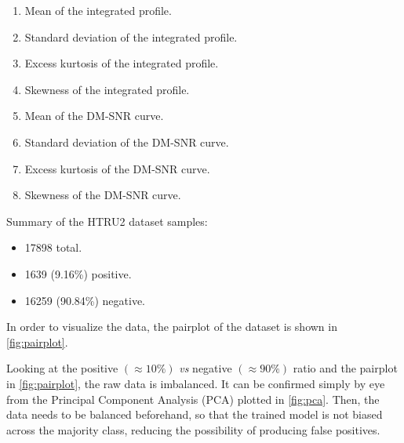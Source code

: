 \begin{multicols}{2}
    \begin{enumerate}
        \item Mean of the integrated profile.
        \item Standard deviation of the integrated profile.
        \item Excess kurtosis of the integrated profile.
        \item Skewness of the integrated profile.
        \item Mean of the DM-SNR curve.
        \item Standard deviation of the DM-SNR curve.
        \item Excess kurtosis of the DM-SNR curve.
        \item Skewness of the DM-SNR curve.
    \end{enumerate}
\end{multicols}

Summary of the HTRU2 dataset samples:

\begin{multicols}{3}
    \begin{itemize}
        \item 17898 total.
        \item 1639 (9.16\%) positive.
        \item 16259 (90.84\%) negative.
    \end{itemize}
\end{multicols}

In order to visualize the data, the pairplot of the dataset is shown in
\ref{fig:pairplot}.


Looking at the positive $\left( \approx 10\% \right)$ \textit{vs} negative 
$\left( \approx 90\% \right)$ ratio and the pairplot in \cref{fig:pairplot},
the raw data is imbalanced.
It can be confirmed simply by eye from the Principal Component Analysis (PCA)
plotted in \cref{fig:pca}.
Then, the data needs to be balanced beforehand, so that the trained model is
not biased across the majority class, reducing the possibility of producing
false positives.


